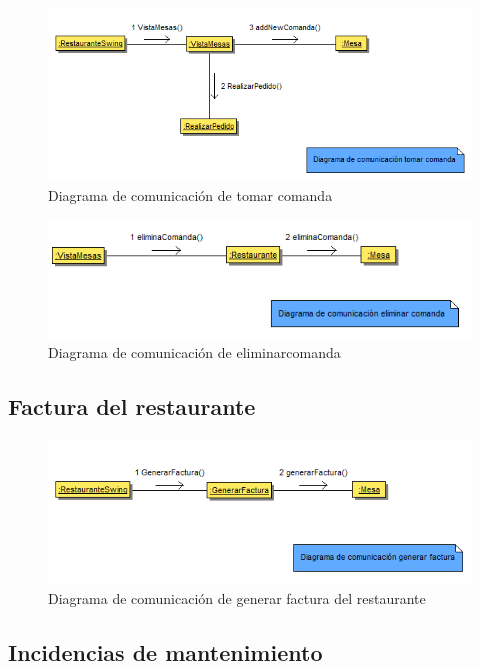 \documentclass[spanish,a4paper,11pt, twoside]{report}	%
\begin{document}
		\begin{figure}[!h]
		\centering
		\includegraphics[scale=0.5]{DCcomanda.png}
		\caption{Diagrama de comunicación de tomar comanda}
		\end{figure}

		\begin{figure}[!h]
		\centering
		\includegraphics[scale=0.5]{DCeliminarcomanda.png}
		\caption{Diagrama de comunicación de eliminarcomanda}
		\end{figure}

		\subsection{Factura del restaurante}

		\begin{figure}[!h]
		\centering
		\includegraphics[scale=0.5]{DCfactura.png}
		\caption{Diagrama de comunicación de generar factura del restaurante }
		\end{figure}


		\subsection{Incidencias de mantenimiento}
\end{document}
